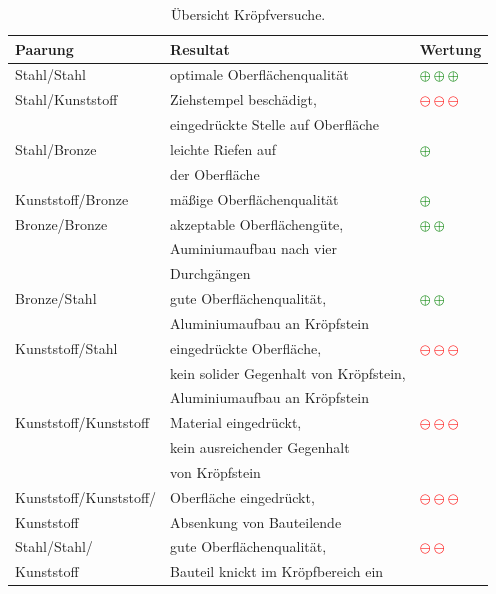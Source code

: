 \documentclass[12pt,a4paper,parskip,twoside,BCOR5mm,headsepline]{scrartcl}
\begin{document}
\begin{description*}
\begin{table}[hbtp]              
\caption{Übersicht Kröpfversuche.}
\label{tab:kropfversuche}
\centering
\begin{tabular}{lll}
\toprule
Paarung &  Resultat &  Wertung  \\
\midrule
Stahl/Stahl&optimale Oberflächenqualität&\textcolor{green}{$\oplus \oplus \oplus$}\\
Stahl/Kunststoff&Ziehstempel beschädigt,&\textcolor{red}{$\ominus\ominus\ominus$}\\
&eingedrückte Stelle auf Oberfläche&\\
Stahl/Bronze&leichte Riefen auf&\textcolor{green}{$\oplus$}\\
&der Oberfläche&\\
Kunststoff/Bronze& mäßige Oberflächenqualität & \textcolor{green}{$\oplus$}\\
Bronze/Bronze&akzeptable Oberflächengüte,&\textcolor{green}{$\oplus\oplus$}\\
&Auminiumaufbau nach vier&\\
&Durchgängen&\\
Bronze/Stahl&gute Oberflächenqualität,&\textcolor{green}{$\oplus\oplus$}\\
&Aluminiumaufbau an Kröpfstein&\\
Kunststoff/Stahl&eingedrückte Oberfläche,&\textcolor{red}{$\ominus\ominus\ominus$}\\
&kein solider Gegenhalt von Kröpfstein,&\\
&Aluminiumaufbau an Kröpfstein&\\
Kunststoff/Kunststoff&Material eingedrückt,&\textcolor{red}{$\ominus\ominus\ominus$}\\
&kein ausreichender Gegenhalt&\\
&von Kröpfstein&\\
Kunststoff/Kunststoff/&Oberfläche eingedrückt,&\textcolor{red}{$\ominus\ominus\ominus$}\\
Kunststoff&Absenkung von Bauteilende&\\
Stahl/Stahl/&gute Oberflächenqualität,&\textcolor{red}{$\ominus\ominus$}\\
Kunststoff&Bauteil knickt im Kröpfbereich ein&\\


\bottomrule
\end{tabular}
\end{table}











\end{description*}
\end{document}
